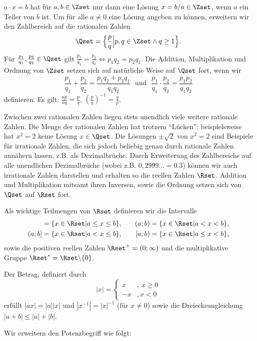 \documentclass[a4paper,10pt]{article}
\begin{document}
$a\cdot x=b$ hat für $a,b\in\Zset$ nur dann eine Lösung $x=b/a\in\Zset$, wenn $a$ ein Teiler von $b$ ist. Um für alle $a\not=0$ eine Lösung angeben zu können, erweitern wir den Zahlbereich auf die rationalen Zahlen
\[
\Qset = \Big\{\frac{p}{q}\Big|p,q\in\Zset\wedge q\ge 1\Big\}.
\]
Für $\frac{p_1}{q_1},\frac{p_2}{q_2}\in\Qset$ gilt $\frac{p_1}{q_1}=\frac{p_2}{q_2}\Leftrightarrow p_1q_2=p_2q_1$. Die Addition, Multiplikation und Ordnung von $\Zset$ setzen sich auf natürliche Weise auf $\Qset$ fort, wenn wir
\[
\frac{p_1}{q_1}+\frac{p_2}{q_2}=\frac{p_1q_2+p_2q_1}{q_1q_2} ~~~\textrm{und}~~~ \frac{p_1}{q_1}\cdot\frac{p_2}{q_2}=\frac{p_1p_2}{q_1q_2}
\]
definieren. Es gilt: $\frac{ap}{aq}=\frac{p}{q}$, $\left(\frac{p}{q}\right)^{-1}=\frac{q}{p}$.

Zwischen zwei rationalen Zahlen liegen stets unendlich viele weitere rationale Zahlen. Die Menge der rationalen Zahlen hat trotzem ``Lücken'': beispielsweise hat $x^2=2$ keine Lösung $x\in\Qset$.
Die Lösungen $\pm\sqrt{2}$ von $x^2=2$ sind Beispiele für irrationale Zahlen, die sich jedoch beliebig genau durch rationale Zahlen annähern lassen, z.B. als Dezimalbrüche. Durch Erweiterung des Zahlbereichs auf alle unendlichen Dezimalbrüche (wobei z.B. $0,2999\ldots=0.3$) können wir auch irrationale Zahlen darstellen und erhalten so die reellen Zahlen $\Rset$. Addition und Multiplikation mitsamt ihren Inversen, sowie die Ordnung
setzen sich von $\Qset$ auf $\Rset$ fort.

Als wichtige Teilmengen von $\Rset$ definieren wir die Intervalle
\begin{align*}
[a;b] &= \{x\in\Rset|a\le x\le b\},~~~&
(a;b) &= \{x\in\Rset|a< x< b\},\\
(a;b] &= \{x\in\Rset|a< x\le b\},~~~&
[a;b) &= \{x\in\Rset|a\le x< b\},
\end{align*}
sowie die positiven reellen Zahlen $\Rset^+=(0;\infty)$ und 
die multiplikative Gruppe $\Rset^*=\Rset\backslash\{0\}$.

Der Betrag, definiert durch
\[
|x| = \left\{\begin{array}{rl}x&,~x\ge 0\\-x&,x<0\end{array}\right.
\]
erfüllt $|ax|=|a||x|$ und $|x^{-1}|=|x|^{-1}$ (für $x\not=0$)
sowie die Dreiecksungleichung $|a+b|\le |a|+|b|$.

\pagebreak Wir erweitern den Potenzbegriff wie folgt:
\end{document}
